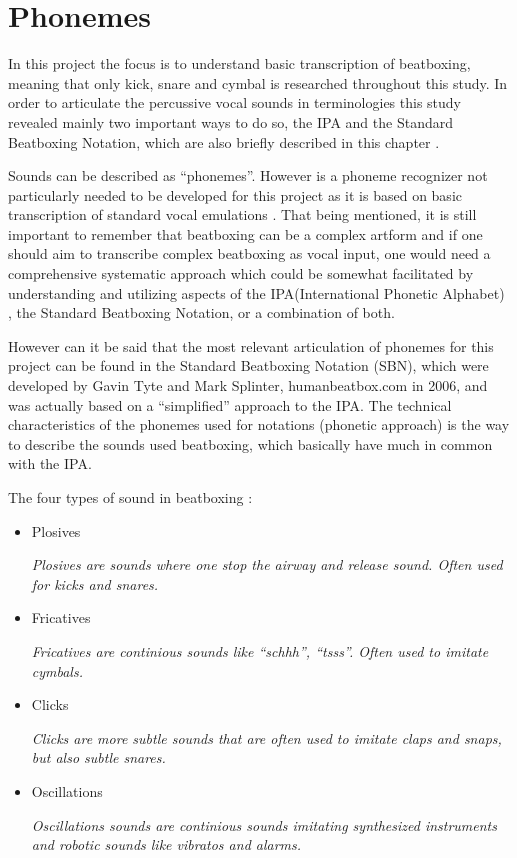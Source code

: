\section{Phonemes}
In this project the focus is to understand basic transcription of beatboxing, meaning that only kick, snare and cymbal is researched throughout this study. In order to articulate the percussive vocal sounds in terminologies this study revealed mainly two important ways to do so, the IPA \citep{ipa,} and the Standard Beatboxing Notation, which are also briefly described in this chapter \citep{humanbeatboxing,}.


Sounds can be described as “phonemes”. However is a phoneme recognizer not particularly needed to be developed for this project as it is based on basic transcription of standard vocal emulations \citep{Janer_syllablingon}. That being mentioned, it is still important to remember that beatboxing can be a complex artform and if one should aim to transcribe complex beatboxing as vocal input, one would need a comprehensive systematic approach which could be somewhat facilitated by understanding and utilizing aspects of the IPA(International Phonetic Alphabet) \citep{ipa}, the Standard Beatboxing Notation, or a combination of both.


However can it be said that the most relevant articulation of phonemes for this project can be found in the Standard Beatboxing Notation (SBN), which were developed by Gavin Tyte and Mark Splinter, humanbeatbox.com in 2006, and was actually based on a “simplified” approach to the IPA. The technical characteristics of the phonemes used for notations (phonetic approach) is the way to describe the sounds used beatboxing, which basically have much in common with the IPA.


The four types of sound in beatboxing \citep{BeatboxBible}:

  \begin{itemize} 
	\item Plosives

	
	\textit{Plosives are sounds where one stop the airway and release sound. Often used for kicks and snares.}
  
	\item Fricatives
	
	
	\textit{Fricatives are continious sounds like “schhh”, “tsss”. Often used to imitate cymbals.}
	
	\item Clicks
	
	
	\textit{Clicks are more subtle sounds that are often used to imitate claps and snaps, but also subtle snares.}
	
	\item Oscillations
	
	\textit{Oscillations sounds are continious sounds imitating synthesized instruments and robotic sounds like vibratos and alarms.}
\end{itemize}

